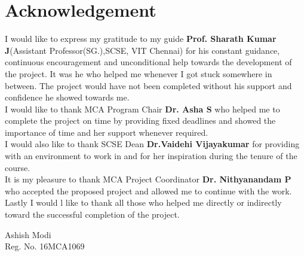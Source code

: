 %
\chapter*{Acknowledgement}
%

I would like to express my gratitude to my guide {\bf Prof. Sharath Kumar J}(Assistant Professor(SG.),SCSE, VIT Chennai) for his constant guidance, continuous encouragement and unconditional help towards the development of the project. It was he who helped me whenever I got stuck somewhere in between. The project
would have not been completed without his support and confidence he showed towards me. \\[0.5 cm]
I would like to thank MCA Program Chair {\bf Dr. Asha S} who helped me to complete the project on time by providing fixed deadlines and showed the importance of time and her support whenever required.
\\[0.5 cm]
I would also like to thank SCSE Dean {\bf Dr.Vaidehi Vijayakumar} for providing with an environment to work in and for her inspiration during the tenure of the course.
\\[0.5 cm]
It is my pleasure to thank MCA Project Coordinator {\bf Dr. Nithyanandam P} who accepted the proposed project and allowed me to continue with the work. \\[0.5 cm]
Lastly I would l like to thank all those who helped me directly or indirectly toward the successful completion of the project. \\[0.5 cm]
 

\begin{flushright}
Ashish Modi\\
Reg. No. 16MCA1069\\
\end{flushright}